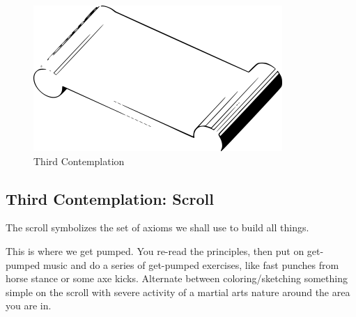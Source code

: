 \begin{figure}[htbp]
\centering
\includegraphics{images/contemplations/contemplation3C.png}
\caption{Third Contemplation}
\end{figure}

\subsection{Third Contemplation:
Scroll}\label{third-contemplation-scroll}

The scroll symbolizes the set of axioms we shall use to build all
things.

This is where we get pumped. You re-read the principles, then put on
get-pumped music and do a series of get-pumped exercises, like fast
punches from horse stance or some axe kicks. Alternate between
coloring/sketching something simple on the scroll with severe activity
of a martial arts nature around the area you are in.
